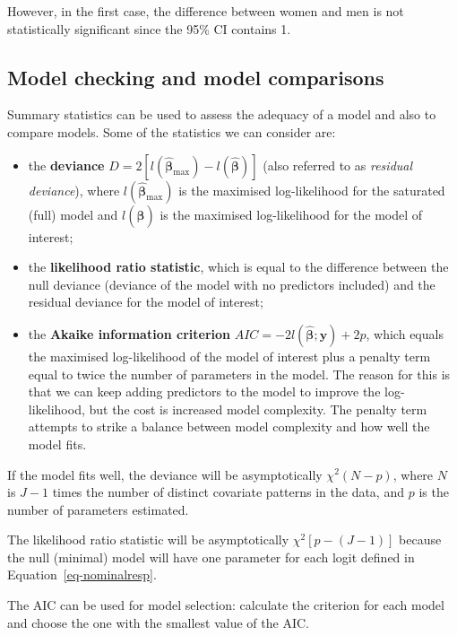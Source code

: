 \documentclass[
  letterpaper,
  DIV=11,
  numbers=noendperiod]{scrartcl}
\providecommand{\tightlist}{%
  \setlength{\itemsep}{0pt}\setlength{\parskip}{0pt}}\usepackage{longtable,booktabs,array}
\begin{document}
However, in the first case, the difference between women and men is not
statistically significant since the 95\% CI contains 1.

\subsection{Model checking and model
comparisons}\label{model-checking-and-model-comparisons}

Summary statistics can be used to assess the adequacy of a model and
also to compare models. Some of the statistics we can consider are:

\begin{itemize}
\tightlist
\item
  the \textbf{deviance}
  \(D=2[l(\hat{\boldsymbol{\beta}}_{\max})-l(\hat{\boldsymbol{\beta}})]\)
  (also referred to as \emph{residual deviance}), where
  \(l(\hat{\boldsymbol{\beta}}_{\max})\) is the maximised log-likelihood
  for the saturated (full) model and \(l(\hat{\boldsymbol{\beta}})\) is
  the maximised log-likelihood for the model of interest;
\item
  the \textbf{likelihood ratio statistic}, which is equal to the
  difference between the null deviance (deviance of the model with no
  predictors included) and the residual deviance for the model of
  interest;
\item
  the \textbf{Akaike information criterion}
  \(AIC=-2l(\hat{\boldsymbol{\beta}};\mathbf{y})+2p\), which equals the
  maximised log-likelihood of the model of interest plus a penalty term
  equal to twice the number of parameters in the model. The reason for
  this is that we can keep adding predictors to the model to improve the
  log-likelihood, but the cost is increased model complexity. The
  penalty term attempts to strike a balance between model complexity and
  how well the model fits.
\end{itemize}

If the model fits well, the deviance will be asymptotically
\(\chi^2(N-p)\), where \(N\) is \(J-1\) times the number of distinct
covariate patterns in the data, and \(p\) is the number of parameters
estimated.

The likelihood ratio statistic will be asymptotically
\(\chi^2[p-(J-1)]\) because the null (minimal) model will have one
parameter for each logit defined in Equation~\ref{eq-nominalresp}.

The AIC can be used for model selection: calculate the criterion for
each model and choose the one with the smallest value of the AIC.
\end{document}

